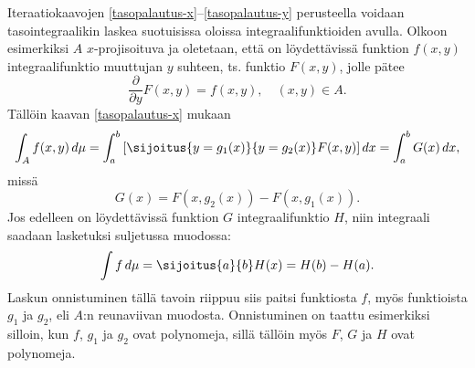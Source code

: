 Iteraatiokaavojen \eqref{tasopalautus-x}--\eqref{tasopalautus-y} perusteella voidaan 
tasointegraalikin laskea suotuisissa oloissa integraalifunktioiden avulla. Olkoon esimerkiksi
$A$ $x$-projisoituva ja oletetaan, että on löydettävissä funktion $f(x,y)$ integraalifunktio
muuttujan $y$ suhteen, ts. funktio $F(x,y)$, jolle pätee
\[
\frac{\partial}{\partial y} F(x,y)=f(x,y),\quad (x,y)\in A.
\]
Tällöin kaavan \eqref{tasopalautus-x} mukaan
\[
\int_A f(x,y)\,d\mu = \int_a^b\left[\sijoitus{y=g_1(x)}{y=g_2(x)}F(x,y)\right]dx
                    =\int_a^b G(x)\,dx,
\]
missä
\[
G(x)=F(x,g_2(x))-F(x,g_1(x)).
\]
Jos edelleen on löydettävissä funktion $G$ integraalifunktio $H$, niin integraali saadaan
lasketuksi suljetussa muodossa:
\[
\int f\,d\mu=\sijoitus{a}{b} H(x)=H(b)-H(a).
\]
Laskun onnistuminen tällä tavoin riippuu siis paitsi funktiosta $f$, myös funktioista $g_1$ ja
$g_2$, eli $A$:n reunaviivan muodosta. Onnistuminen on taattu esimerkiksi silloin, kun $f$, 
$g_1$ ja $g_2$ ovat polynomeja, sillä tällöin myös $F$, $G$ ja $H$ ovat polynomeja.

